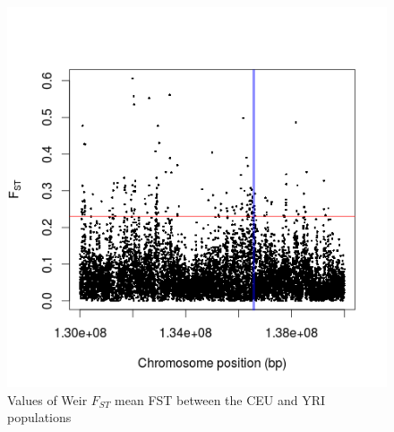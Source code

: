 \documentclass[a4paper,10pt]{article}
\begin{document}
                         \begin{figure}
                         \centering
                         \includegraphics{pictures/WeirCEUYRI.png}
                         \caption{Values of Weir $F_{ST}$ mean FST between the CEU and YRI populations}
                         \label{fig:a}
                         \end{figure}
\end{document}

